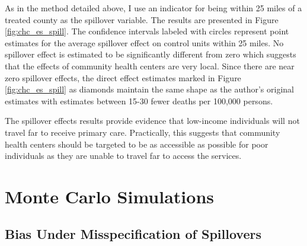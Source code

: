 \documentclass[11pt]{article}
\begin{document}
As in the method detailed above, I use an indicator for being within 25 miles of a treated county as the spillover variable. The results are presented in Figure \ref{fig:chc_es_spill}. The confidence intervals labeled with circles represent point estimates for the average spillover effect on control units within 25 miles. No spillover effect is estimated to be significantly different from zero which suggests that the effects of community health centers are very local. Since there are near zero spillover effects, the direct effect estimates marked in Figure \ref{fig:chc_es_spill} as diamonds maintain the same shape as the author's original estimates with estimates between 15-30 fewer deaths per 100,000 persons. 

The spillover effects results provide evidence that low-income individuals will not travel far to receive primary care. Practically, this suggests that community health centers should be targeted to be as accessible as possible for poor individuals as they are unable to travel far to access the services. 




\section{Monte Carlo Simulations}

\subsection{Bias Under Misspecification of Spillovers}
\end{document}
